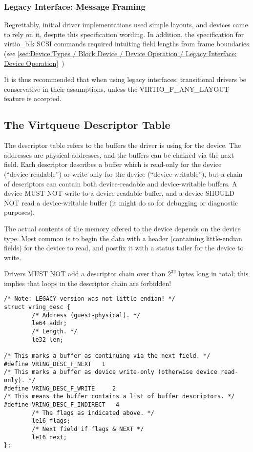 \subsubsection{Legacy Interface: Message Framing}\label{sec:Basic Facilities of a Virtio Device / Virtqueues / Message Framing / Legacy Interface: Message Framing}

Regrettably, initial driver implementations used simple layouts, and
devices came to rely on it, despite this specification wording.  In
addition, the specification for virtio_blk SCSI commands required
intuiting field lengths from frame boundaries (see
 \ref{sec:Device Types / Block Device / Device Operation / Legacy Interface: Device Operation}~)

It is thus recommended that when using legacy interfaces, transitional
drivers be conservative in their assumptions, unless the
VIRTIO_F_ANY_LAYOUT feature is accepted.

\subsection{The Virtqueue Descriptor Table}\label{sec:Basic Facilities of a Virtio Device / Virtqueues / The Virtqueue Descriptor Table}

The descriptor table refers to the buffers the driver is using for
the device. The addresses are physical addresses, and the buffers
can be chained via the next field. Each descriptor describes a
buffer which is read-only for the device (``device-readable'') or write-only for the device (``device-writable''), but a chain of
descriptors can contain both device-readable and device-writable buffers.
A device MUST NOT write to a device-readable buffer, and a device SHOULD NOT
read a device-writable buffer (it might do so for debugging or diagnostic
purposes).

The actual contents of the memory offered to the device depends on the
device type.  Most common is to begin the data with a header
(containing little-endian fields) for the device to read, and postfix
it with a status tailer for the device to write.

Drivers MUST NOT add a descriptor chain over than $2^{32}$ bytes long in total;
this implies that loops in the descriptor chain are forbidden!

\begin{lstlisting}
/* Note: LEGACY version was not little endian! */
struct vring_desc {
        /* Address (guest-physical). */
        le64 addr;
        /* Length. */
        le32 len;

/* This marks a buffer as continuing via the next field. */
#define VRING_DESC_F_NEXT   1
/* This marks a buffer as device write-only (otherwise device read-only). */
#define VRING_DESC_F_WRITE     2
/* This means the buffer contains a list of buffer descriptors. */
#define VRING_DESC_F_INDIRECT   4
        /* The flags as indicated above. */
        le16 flags;
        /* Next field if flags & NEXT */
        le16 next;
};
\end{lstlisting}


